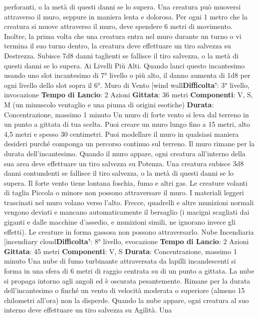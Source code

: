 \begin{multicols}{2}
perforanti, o la metà di questi danni se lo supera.
Una creatura può muoversi attraverso il muro, seppure
in maniera lenta e dolorosa. Per ogni 1 metro che la
creatura si muove attraverso il muro, deve spendere 6
metri di movimento. Inoltre, la prima volta che una
creatura entra nel muro durante un turno o vi termina il
suo turno dentro, la creatura deve effettuare un tiro
salvezza su Destrezza. Subisce 7d8 danni taglienti se
fallisce il tiro salvezza, o la metà di questi danni se lo
supera.
Ai Livelli Più Alti. Quando lanci questo incantesimo
usando uno slot incantesimo di 7° livello o più alto, il
danno aumenta di 1d8 per ogni livello dello slot sopra il
6°.
Muro di Vento
[wind wall\textbf{Difficolta'}:
3° livello, invocazione
\textbf{Tempo di Lancio}: 2 Azioni
\textbf{Gittata}: 36 metri
\textbf{Componenti}: V, S, M (un minuscolo ventaglio e una
piuma di origini esotiche)
\textbf{Durata}: Concentrazione, massimo 1 minuto
Un muro di forte vento si leva dal terreno in un punto a
gittata di tua scelta. Puoi creare un muro lungo fino a 15
metri, alto 4,5 metri e spesso 30 centimetri. Puoi
modellare il muro in qualsiasi maniera desideri purché
componga un percorso continuo sul terreno. Il muro
rimane per la durata dell’incantesimo.
Quando il muro appare, ogni creatura all’interno della
sua area deve effettuare un tiro salvezza su Potenza. Una
creatura subisce 3d8 danni contundenti se fallisce il tiro
salvezza, o la metà di questi danni se lo supera.
Il forte vento tiene lontana foschia, fumo e altri gas. Le
creature volanti di taglia Piccola o minore non possono
attraversare il muro. I materiali leggeri trascinati nel
muro volano verso l’alto. Frecce, quadrelli e altre
munizioni normali vengono deviati e mancano
automaticamente il bersaglio (i macigni scagliati dai
giganti e dalle macchine d’assedio, e munizioni simili,
ne ignorano invece gli effetti). Le creature in forma
gassosa non possono attraversarlo.
Nube Incendiaria
[incendiary cloud\textbf{Difficolta'}:
8° livello, evocazione
\textbf{Tempo di Lancio}: 2 Azioni
\textbf{Gittata}: 45 metri
\textbf{Componenti}: V, S
\textbf{Durata}: Concentrazione, massimo 1 minuto
Una nube di fumo turbinante attraversata da lapilli
incandescenti si forma in una sfera di 6 metri di raggio
centrata su di un punto a gittata. La nube si propaga
intorno agli angoli ed è oscurata pesantemente. Rimane
per la durata dell’incantesimo o finché un vento di
velocità moderata o superiore (almeno 15 chilometri
all’ora) non la disperde.
Quando la nube appare, ogni creatura al suo interno
deve effettuare un tiro salvezza su Agilità. Una

\end{multicols}
